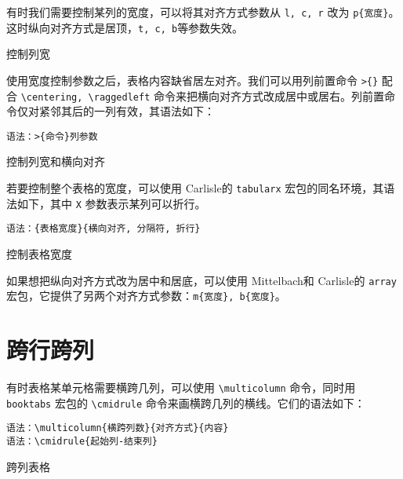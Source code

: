 有时我们需要控制某列的宽度，可以将其对齐方式参数从 \texttt{l, c, r} 改为 \verb|p{宽度}|。这时纵向对齐方式是居顶，\texttt{t, c, b}等参数失效。

\begin{example}[htbp]
\caption{控制列宽}
\label{tab:width_tab}
\end{example}

使用宽度控制参数之后，表格内容缺省居左对齐。我们可以用列前置命令 \verb|>{}| 配合 
\verb|\centering, \raggedleft| 命令来把横向对齐方式改成居中或居右。列前置命令仅对紧邻其后的一列有效，其语法如下：

\verb|语法：>{命令}列参数|


\begin{example}[htbp]
\caption{控制列宽和横向对齐}
\label{tab:width_aligned_tab}
\end{example}

若要控制整个表格的宽度，可以使用 Carlisle\indexCarlisle 的 \texttt{tabularx} 宏包\citep{Carlisle_tabularx}的同名环境，其语法如下，其中 \texttt{X} 参数表示某列可以折行。

\verb|语法：{表格宽度}{横向对齐, 分隔符, 折行}|

\begin{example}[htbp]
\caption{控制表格宽度}
\label{tab:tabularx_tab}
\end{example}

如果想把纵向对齐方式改为居中和居底，可以使用 Mittelbach\indexMittelbach 和 Carlisle的 \texttt{array} 宏包\citep{Mittelbach_array}，它提供了另两个对齐方式参数：\verb|m{宽度}, b{宽度}|。

\section{跨行跨列}

有时表格某单元格需要横跨几列，可以使用 \verb|\multicolumn| 命令，同时用 \texttt{booktabs} 宏包的 \verb|\cmidrule| 命令来画横跨几列的横线。它们的语法如下：

\verb|语法：\multicolumn{横跨列数}{对齐方式}{内容}|\\
\indent\verb|语法：\cmidrule{起始列-结束列}|

\begin{example}[htbp]
\caption{跨列表格}
\label{tab:multicol_tab}
\end{example}

